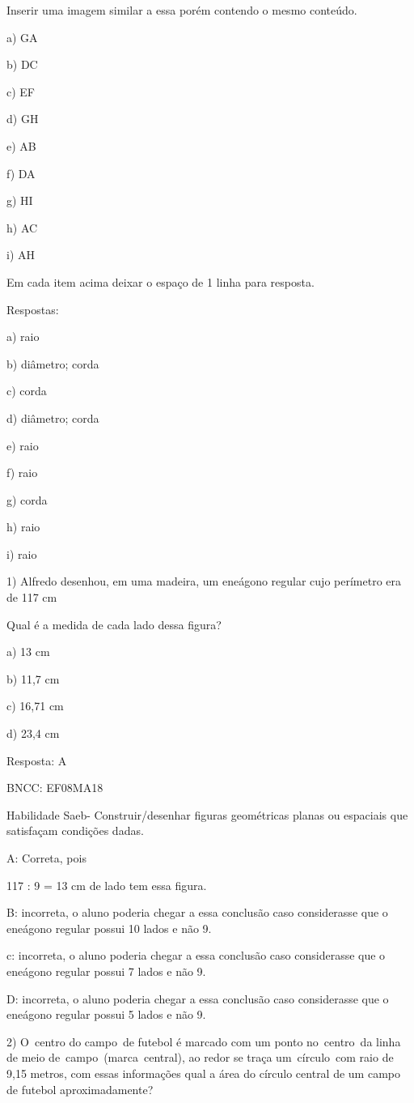 Inserir uma imagem similar a essa porém contendo o mesmo conteúdo.

a) GA

b) DC

c) EF

d) GH

e) AB

f) DA

g) HI

h) AC

i) AH

Em cada item acima deixar o espaço de 1 linha para resposta.

Respostas:

a) raio

b) diâmetro; corda

c) corda

d) diâmetro; corda

e) raio

f) raio

g) corda

h) raio

i) raio


1) Alfredo desenhou, em uma madeira, um eneágono regular cujo perímetro
era de 117 cm

Qual é a medida de cada lado dessa figura?

a) 13 cm

b) 11,7 cm

c) 16,71 cm

d) 23,4 cm

Resposta: A

BNCC: EF08MA18

Habilidade Saeb- Construir/desenhar figuras geométricas planas ou
espaciais que satisfaçam condições dadas.

A: Correta, pois

117 : 9 = 13 cm de lado tem essa figura.

B: incorreta, o aluno poderia chegar a essa conclusão caso considerasse
que o eneágono regular possui 10 lados e não 9.

c: incorreta, o aluno poderia chegar a essa conclusão caso considerasse
que o eneágono regular possui 7 lados e não 9.

D: incorreta, o aluno poderia chegar a essa conclusão caso considerasse
que o eneágono regular possui 5 lados e não 9.

2) O~centro do campo~de futebol é marcado com um ponto no~centro~da
linha de meio de~campo~(marca~central), ao redor se traça um~círculo~com
raio de 9,15 metros, com essas informações qual a área do círculo
central de um campo de futebol aproximadamente?

